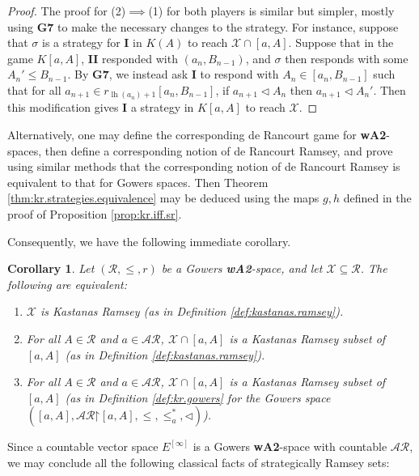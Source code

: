 \documentclass[11pt,reqno]{amsart}
\theoremstyle{plain}
\numberwithin{equation}{section}
\newtheorem{corollary}[theorem]{Corollary}
\theoremstyle{definition}
\newcommand{\func}{\operatorname}
\newcommand{\cal}{\mathcal}
\newcommand{\restrictedto}{\mathord{\upharpoonright}}
\newcommand{\X}{\cal{X}}
\newcommand{\lh}{\func{lh}}
\begin{document}
\begin{proof}
     The proof for (2)$\implies$(1) for both players is similar but simpler, mostly using \textbf{G7} to make the necessary changes to the strategy. For instance, suppose that $\sigma$ is a strategy for \textbf{I} in $K(A)$ to reach $\X \cap [a,A]$. Suppose that in the game $K[a,A]$, \textbf{II} responded with $(a_n,B_{n-1})$, and $\sigma$ then responds with some $A_n' \leq B_{n-1}$. By \textbf{G7}, we instead ask \textbf{I} to respond with $A_n \in [a_n,B_{n-1}]$ such that for all $a_{n+1} \in r_{\lh(a_n)+1}[a_n,B_{n-1}]$, if $a_{n+1} \lhd A_n$ then $a_{n+1} \lhd A_n'$. Then this modification gives \textbf{I} a strategy in $K[a,A]$ to reach $\X$.
\end{proof}

Alternatively, one may define the corresponding de Rancourt game for \textbf{wA2}-spaces, then define a corresponding notion of de Rancourt Ramsey, and prove using similar methods that the corresponding notion of de Rancourt Ramsey is equivalent to that for Gowers spaces. Then Theorem \ref{thm:kr.strategies.equivalence} may be deduced using the maps $g,h$ defined in the proof of Proposition \ref{prop:kr.iff.sr}.

Consequently, we have the following immediate corollary.

\begin{corollary}
\label{cor:kr.equivalence}
    Let $(\cal{R},\leq,r)$ be a Gowers \textbf{wA2}-space, and let $\X \subseteq \cal{R}$. The following are equivalent:
    \begin{enumerate}
        \item $\X$ is Kastanas Ramsey (as in Definition \ref{def:kastanas.ramsey}).

        \item For all $A \in \cal{R}$ and $a \in \cal{AR}$, $\X \cap [a,A]$ is a Kastanas Ramsey subset of $[a,A]$ (as in Definition \ref{def:kastanas.ramsey}).

        \item For all $A \in \cal{R}$ and $a \in \cal{AR}$, $\X \cap [a,A]$ is a Kastanas Ramsey subset of $[a,A]$ (as in Definition \ref{def:kr.gowers} for the Gowers space $([a,A],\cal{AR}\restrictedto[a,A],\leq,\leq_a^*,\lhd)$).
    \end{enumerate}
\end{corollary}

Since a countable vector space $E^{[\infty]}$ is a Gowers \textbf{wA2}-space with countable $\cal{AR}$, we may conclude all the following classical facts of strategically Ramsey sets:
\end{document}
